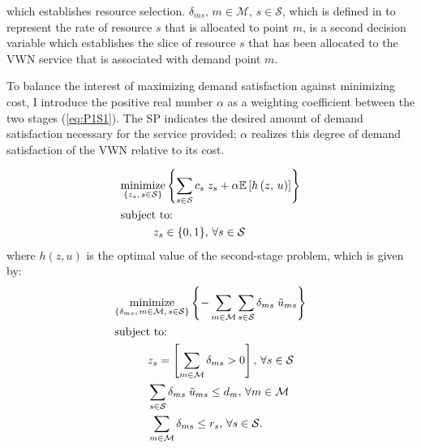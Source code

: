 \documentclass[12pt,dvipsnames]{report}
\begin{document}
which establishes resource selection.  $\delta_{ms},\, m \in \mathcal{M},\, s \in \mathcal{S}$, which is defined in  to represent the rate of resource $s$ that is allocated to point $m$, is a second decision variable which establishes the slice of resource $s$ that has been allocated to the VWN service that is associated with demand point $m$.

To balance the interest of maximizing demand satisfaction against minimizing cost, I introduce the positive real number $\alpha$ as a weighting coefficient between the two stages (\cref{eq:P1S1}).  The SP indicates the desired amount of demand satisfaction necessary for the service provided; $\alpha$ realizes this degree of demand satisfaction of the VWN relative to its cost.

\begin{tcolorbox}[floatplacement = !ht, float, title = Problem 1 (Two-Stage Stochastic Optimization Program)]
\begin{align}
& \underset{\left\{z_s,\, s \in \mathcal{S}\right\}}{\text{minimize}} \left\{ \sum_{s \in \mathcal{S}} c_s \; z_s + \alpha \mathbb{E}\left[ h\left( z,\, u \right) \right] \right\} \label{eq:P1S1}\\
& \text{subject to:}  \nonumber \\
& \hspace{0.4in} z_s \in \{0, 1\},\, \forall s \in \mathcal{S} \label{eq:P1S1C1}
\end{align}
where $h(z, u)$ is the optimal value of the second-stage problem, which is given by:
\begin{align}
& \underset{\left\{\substack{\delta_{ms},\, m \in \mathcal{M},\, s \in \mathcal{S}}\right\}}{\mathrm{minimize}} \left\{ - \sum_{m \in \mathcal{M}} \sum_{s \in \mathcal{S}} \delta_{ms} \; \tilde{u}_{ms} \right\} \label{eq:P1S2}\\
& \text{subject to:}  \nonumber \\
& \hspace{0.4in} z_s = \left[\sum_{m \in \mathcal{M}} \delta_{ms} > 0\right],\, \forall s \in \mathcal{S} \label{eq:P1S2C1}\\
& \hspace{0.4in} \sum_{s \in \mathcal{S}} \delta_{ms} \; \tilde{u}_{ms} \leq d_m,\, \forall m \in \mathcal{M} \label{eq:P1S2C2}\\
& \hspace{0.4in} \sum_{m \in \mathcal{M}} \delta_{ms} \leq r_s,\, \forall s \in \mathcal{S}. \label{eq:P1S2C3}
\end{align}
\end{tcolorbox}
\end{document}
